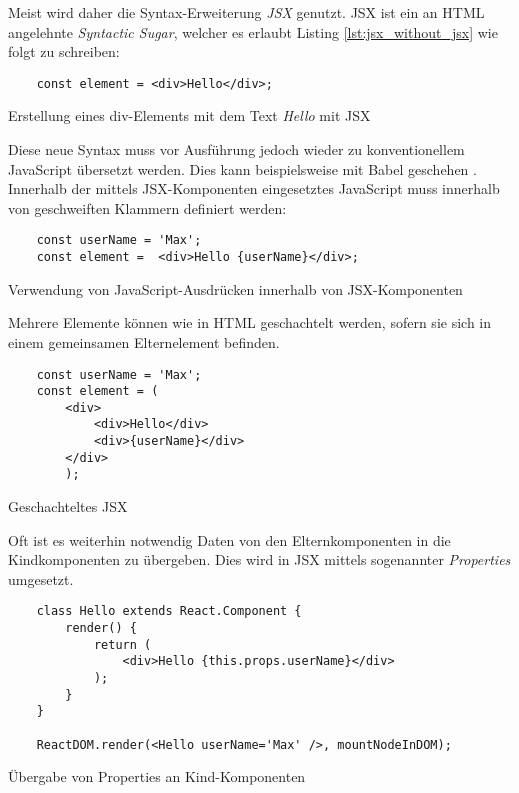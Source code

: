 Meist wird daher die Syntax-Erweiterung \textit{JSX} genutzt. JSX ist ein an HTML angelehnte \textit{Syntactic Sugar}, welcher es erlaubt Listing \ref{lst:jsx_without_jsx} wie folgt zu schreiben:
\begin{listing}[H]
    \begin{verbatim}
    const element = <div>Hello</div>;
    \end{verbatim}
    \caption{Erstellung eines div-Elements mit dem Text \textit{Hello} mit JSX}
    \label{lst:jsx_with_jsx}
\end{listing}
Diese neue Syntax muss vor Ausführung jedoch wieder zu konventionellem JavaScript übersetzt werden. Dies kann beispielsweise mit Babel geschehen \cite{facebook_inc._introducing_2016}.
Innerhalb der mittels JSX-Komponenten eingesetztes JavaScript muss innerhalb von geschweiften Klammern definiert werden: 

\begin{listing}[H]
    \begin{verbatim}
    const userName = 'Max';
    const element =  <div>Hello {userName}</div>;
    \end{verbatim}
    \caption{Verwendung von JavaScript-Ausdrücken innerhalb von JSX-Komponenten}
    \label{lst:embedded_expression}
\end{listing}

Mehrere Elemente können wie in HTML geschachtelt werden, sofern sie sich in einem gemeinsamen Elternelement befinden.

\begin{listing}[H]
    \begin{verbatim}
    const userName = 'Max';
    const element = (
        <div>
            <div>Hello</div>
            <div>{userName}</div>
        </div>
        );
    \end{verbatim}
    \caption{Geschachteltes JSX}
    \label{lst:jsx_nested}
\end{listing}

Oft ist es weiterhin notwendig Daten von den Elternkomponenten in die Kindkomponenten zu übergeben. Dies wird in JSX mittels sogenannter \textit{Properties} umgesetzt.

\begin{listing}[H]
    \begin{verbatim}
    class Hello extends React.Component {
        render() {
            return (
                <div>Hello {this.props.userName}</div>
            );
        }
    }
    
    ReactDOM.render(<Hello userName='Max' />, mountNodeInDOM);
    \end{verbatim}
    \caption{Übergabe von Properties an Kind-Komponenten}
    \label{lst:jsx_nested}
\end{listing}




